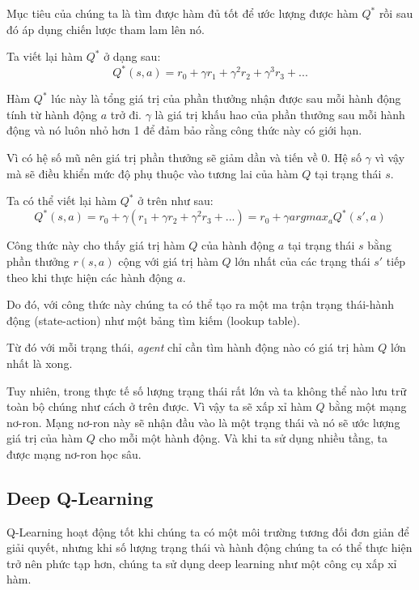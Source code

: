Mục tiêu của chúng ta là tìm được hàm đủ tốt để ước lượng được hàm
$Q^*$ rồi sau đó áp dụng chiến lược tham lam lên nó.

Ta viết lại hàm $Q^*$ ở dạng sau:
\begin{equation*}
    Q^*(s,a) = r_0 + {\gamma}r_1 + {\gamma}^{2}r_2 + {\gamma}^{3}r_3 + ...
\end{equation*}

Hàm $Q^*$ lúc này là tổng giá trị của phần thưởng nhận được sau
mỗi hành động tính từ hành động $a$ trở đi. $\gamma$ là giá trị
khấu hao của phần thưởng sau mỗi hành động và nó luôn nhỏ hơn 1
để đảm bảo rằng công thức này có giới hạn.

Vì có hệ số mũ nên giá trị phần thưởng sẽ giảm dần và tiến về 0.
Hệ số $\gamma$ vì vậy mà sẽ điều khiển mức độ phụ thuộc vào
tương lai của hàm $Q$ tại trạng thái $s$.

Ta có thể viết lại hàm $Q^*$ ở trên như sau:
\begin{equation*}
    Q^*(s,a) = r_0 + {\gamma}(r_1 + {\gamma}r_2 + {\gamma}^{2}r_3 + ...) = r_0 + {\gamma}argmax_{a}Q^{*}(s',a)
\end{equation*}

Công thức này cho thấy giá trị hàm $Q$ của hành động $a$ tại
trạng thái $s$ bằng phần thưởng $r(s,a)$ cộng với giá trị hàm $Q$
lớn nhất của các trạng thái $s'$ tiếp theo khi thực hiện
các hành động $a$.

Do đó, với công thức này chúng ta có thể tạo ra một ma trận
trạng thái-hành động (state-action) như một bảng tìm kiếm
(lookup table).

Từ đó với mỗi trạng thái, \textit{agent} chỉ cần tìm hành động
nào có giá trị hàm $Q$ lớn nhất là xong.

Tuy nhiên, trong thực tế số lượng trạng thái rất lớn và ta
không thể nào lưu trữ toàn bộ chúng như cách ở trên được.
Vì vậy ta sẽ xấp xỉ hàm $Q$ bằng một mạng nơ-ron.
Mạng nơ-ron này sẽ nhận đầu vào là một trạng thái và
nó sẽ ước lượng giá trị của hàm $Q$ cho mỗi một hành động.
Và khi ta sử dụng nhiều tầng, ta được mạng nơ-ron học sâu.

\subsection{Deep Q-Learning}
Q-Learning hoạt động tốt khi chúng ta có một môi trường tương đối
đơn giản để giải quyết, nhưng khi số lượng trạng thái và hành động
chúng ta có thể thực hiện trở nên phức tạp hơn, chúng ta sử dụng
deep learning như một công cụ xấp xỉ hàm.

